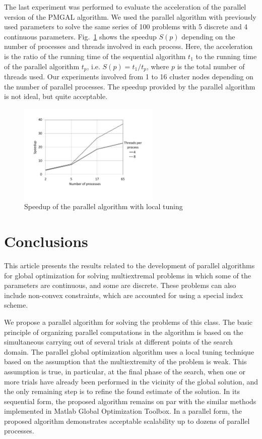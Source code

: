 \documentclass[
11pt,%
tightenlines,%
twoside,%
onecolumn,%
nofloats,%
nobibnotes,%
nofootinbib,%
superscriptaddress,%
noshowpacs,%
centertags]%
{revtex4}
\begin{document}
The last experiment was performed to evaluate the acceleration of the parallel version of the PMGAL algorithm.
We used the parallel algorithm with previously used parameters to solve the same series of 100 problems with 5 discrete and 4 continuous parameters.
Fig.~\ref{fig:3} shows the speedup $S(p)$ depending on the number of processes and threads involved in each process. Here, the acceleration is the ratio of the running time of the sequential algorithm  $t_1$ to the running time of the parallel algorithm $t_p$, i.e. $S(p) = t_1/t_p$, where $p$ is the total number of threads used.
Our experiments involved from 1 to 16 cluster nodes depending on the number of parallel processes. The speedup provided by the parallel algorithm is not ideal, but quite acceptable.

\begin{figure}[ht]
    \centering
    \includegraphics[width=0.6\textwidth]{speedup.pdf}
    \caption{Speedup of the parallel algorithm with local tuning}
    \label{fig:3}
\end{figure}




\section{Conclusions}

This article presents the results related to the development of parallel algorithms for global optimization for solving multiextremal problems in which some of the parameters are continuous, and some are discrete.
These problems can also include non-convex constraints, which are accounted for using a special index scheme.

We propose a parallel algorithm for solving the problems of this class. The basic principle of organizing parallel computations in the algorithm is based on the simultaneous carrying out of several trials at different points of the search domain.
The parallel global optimization algorithm uses a local tuning technique based on the assumption that the multiextremity of the problem is weak. This assumption is true, in particular, at the final phase of the search, when one or more trials have already been performed in the vicinity of the global solution, and the only remaining step is to refine the found estimate of the solution.
In its sequential form, the proposed algorithm remains on par with the similar methods implemented in Matlab Global Optimization Toolbox.
In a parallel form, the proposed algorithm demonstrates acceptable scalability up to dozens of parallel processes.
\end{document}
